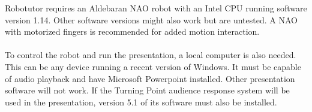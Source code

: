 Robotutor requires an Aldebaran NAO robot with an Intel CPU running software version 1.14. Other software versions might also work but are untested. A NAO with motorized fingers is recommended for added motion interaction.\\
\\
To control the robot and run the presentation, a local computer is also needed. This can be any device running a recent version of Windows. It must be capable of audio playback and have Microsoft Powerpoint installed. Other presentation software will not work. If the Turning Point audience response system will be used in the presentation, version 5.1 of its software must also be installed.

